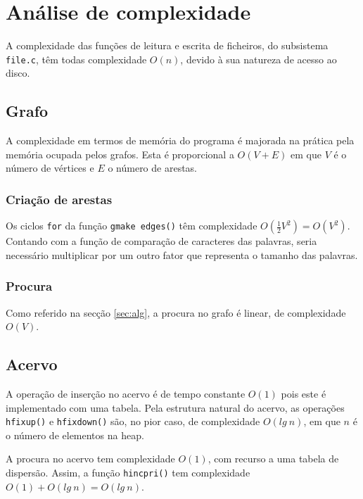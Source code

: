 \documentclass[portuguese, a4paper]{article}
\newcommand\tu[0]{\textunderscore}
\begin{document}
\section{Análise de complexidade}
	\par
	A complexidade das funções de leitura e escrita de ficheiros, do subsistema \texttt{file.c}, têm todas complexidade $O(n)$, devido à sua natureza de acesso ao disco.

	\subsection{Grafo}
	\par
	A complexidade em termos de memória do programa é majorada na prática pela
	memória ocupada pelos grafos. Esta é proporcional a $O(V + E)$ em que $V$ é
	o número de vértices e $E$ o número de arestas.

	\subsubsection{Criação de arestas}
	\par
	Os ciclos \texttt{for} da função \texttt{g\tu make\ edges()} têm
	complexidade $O(\frac{1}{2}V^2) = O(V^2)$. Contando com a função de
	comparação de caracteres das palavras, seria necessário multiplicar por um
	outro fator que representa o tamanho das palavras.

	\subsubsection{Procura}
	\par
	Como referido na secção \ref{sec:alg}, a procura no grafo é linear, de
	complexidade $O(V)$.

	\subsection{Acervo}
	\par
	A operação de inserção no acervo é de tempo constante $O(1)$ pois este é
	implementado com uma tabela. Pela estrutura natural do acervo, as operações
	\texttt{h\tu fixup()} e \texttt{h\tu fixdown()} são, no pior caso, de
	complexidade $O(lg~n)$, em que $n$ é o número de elementos na heap.
	\par
	A procura no acervo tem complexidade $O(1)$, com recurso a uma tabela de
	dispersão. Assim, a função \texttt{h\tu inc\tu pri()} tem complexidade
	$O(1) + O(lg~n) = O(lg~n)$.
\end{document}
